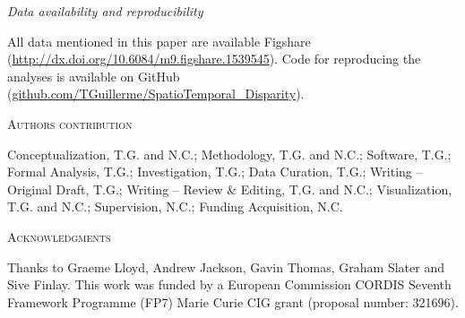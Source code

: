 \documentclass[12pt,letterpaper]{article}
\renewcommand{\section}[1]{%
\bigskip
\begin{center}
\begin{Large}
\normalfont\scshape #1
\medskip
\end{Large}
\end{center}}
\renewcommand{\subsection}[1]{%
\bigskip
\begin{center}
\begin{large}
\normalfont\itshape #1
\end{large}
\end{center}}
\begin{document}
\subsection{Data availability and reproducibility}
All data mentioned in this paper are available Figshare (\url{http://dx.doi.org/10.6084/m9.figshare.1539545}).
Code for reproducing the analyses is available on GitHub (\url{github.com/TGuillerme/SpatioTemporal_Disparity}).

\section{Authors contribution}
Conceptualization, T.G. and N.C.; Methodology, T.G. and N.C.; Software, T.G.; Formal Analysis, T.G.; Investigation, T.G.; Data Curation, T.G.; Writing – Original Draft, T.G.; Writing – Review \& Editing, T.G. and N.C.; Visualization, T.G. and N.C.; Supervision, N.C.; Funding Acquisition, N.C.

\section{Acknowledgments}
Thanks to Graeme Lloyd, Andrew Jackson, Gavin Thomas, Graham Slater and Sive Finlay.
This work was funded by a European Commission CORDIS Seventh Framework Programme (FP7) Marie Curie CIG grant (proposal number: 321696).
\end{document}
